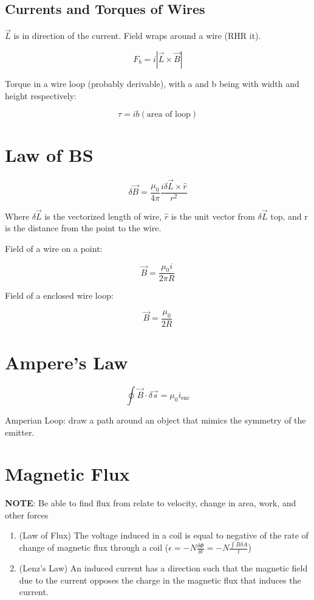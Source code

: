 \documentclass{article}
\begin{document}
\subsection{Currents and Torques of Wires}

$\vec{L}$ is in direction of the current. Field wraps around a wire (RHR it).

$$F_b = i |\vec{L} \times \vec{B} |$$

Torque in a wire loop (probably derivable), with a and b being with width and height respectively: 

$$\tau = ib (\text{area of loop})$$

\section{Law of BS}

$$\delta \vec{B} = \frac{\mu_0}{4\pi} \frac{i \delta \vec{L} \times \hat{r}}{r^2}$$

Where $\delta \vec{L}$ is the vectorized length of wire, $\hat{r}$ is the unit vector from $\delta \vec{L}$ top, and r is the distance from the point to the wire.

Field of a wire on a point:

$$\vec{B} = \frac{\mu_0 i}{2 \pi R}$$

Field of a enclosed wire loop:

$$\vec{B} = \frac{\mu_0}{2R}$$

\section{Ampere's Law}

$$\oint \vec{B} \cdot \delta \vec{s} = \mu_0 i_{\text{enc}}$$

Amperian Loop: draw a path around an object that mimics the symmetry of the emitter. 

\section{Magnetic Flux}

\textbf{NOTE}: Be able to find flux from relate to velocity, change in area, work, and other forces

\begin{enumerate}
    \item (Law of Flux) The voltage induced in a coil is equal to negative of the rate of change of magnetic flux through a coil ($\epsilon = - N\frac{\delta \Phi}{\delta t} = -N\frac{\int B \delta A}{t}$)
    \item (Lenz's Law) An induced current has a direction such that the magnetic field due to the current opposes the charge in the magnetic  flux that induces the current. 
\end{enumerate}
\end{document}
